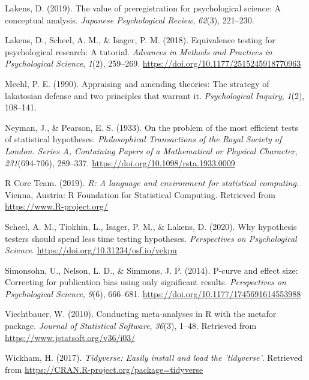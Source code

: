 \documentclass[
  english,
  doc,floatsintext]{apa6}
\begin{document}
\leavevmode\hypertarget{ref-lakens2019}{}%
Lakens, D. (2019). The value of preregistration for psychological science: A conceptual analysis. \emph{Japanese Psychological Review}, \emph{62}(3), 221--230.

\leavevmode\hypertarget{ref-lakens2018}{}%
Lakens, D., Scheel, A. M., \& Isager, P. M. (2018). Equivalence testing for psychological research: A tutorial. \emph{Advances in Methods and Practices in Psychological Science}, \emph{1}(2), 259--269. \url{https://doi.org/10.1177/2515245918770963}

\leavevmode\hypertarget{ref-meehl1990}{}%
Meehl, P. E. (1990). Appraising and amending theories: The strategy of lakatosian defense and two principles that warrant it. \emph{Psychological Inquiry}, \emph{1}(2), 108--141.

\leavevmode\hypertarget{ref-neyman1933}{}%
Neyman, J., \& Pearson, E. S. (1933). On the problem of the most efficient tests of statistical hypotheses. \emph{Philosophical Transactions of the Royal Society of London. Series A, Containing Papers of a Mathematical or Physical Character}, \emph{231}(694-706), 289--337. \url{https://doi.org/10.1098/rsta.1933.0009}

\leavevmode\hypertarget{ref-R-base}{}%
R Core Team. (2019). \emph{R: A language and environment for statistical computing}. Vienna, Austria: R Foundation for Statistical Computing. Retrieved from \url{https://www.R-project.org/}

\leavevmode\hypertarget{ref-scheel_why_2020}{}%
Scheel, A. M., Tiokhin, L., Isager, P. M., \& Lakens, D. (2020). Why hypothesis testers should spend less time testing hypotheses. \emph{Perspectives on Psychological Science}. \url{https://doi.org/10.31234/osf.io/vekpu}

\leavevmode\hypertarget{ref-simonsohn2014}{}%
Simonsohn, U., Nelson, L. D., \& Simmons, J. P. (2014). P-curve and effect size: Correcting for publication bias using only significant results. \emph{Perspectives on Psychological Science}, \emph{9}(6), 666--681. \url{https://doi.org/10.1177/1745691614553988}

\leavevmode\hypertarget{ref-R-metafor}{}%
Viechtbauer, W. (2010). Conducting meta-analyses in R with the metafor package. \emph{Journal of Statistical Software}, \emph{36}(3), 1--48. Retrieved from \url{https://www.jstatsoft.org/v36/i03/}

\leavevmode\hypertarget{ref-R-tidyverse}{}%
Wickham, H. (2017). \emph{Tidyverse: Easily install and load the 'tidyverse'}. Retrieved from \url{https://CRAN.R-project.org/package=tidyverse}

\endgroup
\end{document}
